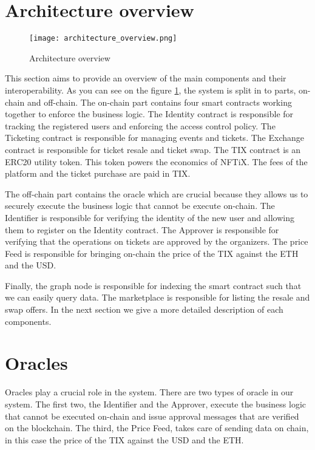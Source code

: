 \documentclass[a4paper,11pt,oneside]{report}
\begin{document}
\section{Architecture overview}

\begin{figure}[h!] 
  \centering
  \texttt{[image: architecture\_overview.png]}
  \caption{Architecture overview}
  \label{fig:architecture_overview}
\end{figure}

This section aims to provide an overview of the main components and their interoperability. As you can see on the figure \hyperref[fig:architecture_overview]{\ref{fig:architecture_overview}}, the system is split in to parts, on-chain and off-chain. The on-chain part contains four smart contracts working together to enforce the business logic. The Identity contract is responsible for tracking the registered users and enforcing the access control policy. The Ticketing contract is responsible for managing events and tickets. The Exchange contract is responsible for ticket resale and ticket swap. The TIX contract is an ERC20 utility token. This token powers the economics of NFTiX. The fees of the platform and the ticket purchase are paid in TIX.  

The off-chain part contains the oracle which are crucial because they allows us to securely execute the business logic that cannot be execute on-chain. The Identifier is responsible for verifying the identity of the new user and allowing them to register on the Identity contract. The Approver is responsible for verifying that the operations on tickets are approved by the organizers. The price Feed is responsible for bringing on-chain the price of the TIX against the ETH and the USD. 

Finally, the graph node is responsible for indexing the smart contract such that we can easily query data. The marketplace is responsible for listing the resale and swap offers. In the next section we give a more detailed description of each components.

\section{Oracles}
Oracles play a crucial role in the system. There are two types of oracle in our system. The first two, the Identifier and the Approver, execute the business logic that cannot be executed on-chain and issue approval messages that are verified on the blockchain. The third, the Price Feed, takes care of sending data on chain, in this case the price of the TIX against the USD and the ETH.
\end{document}
